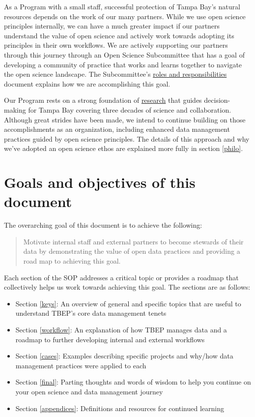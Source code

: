 \documentclass[
]{book}
\providecommand{\tightlist}{%
  \setlength{\itemsep}{0pt}\setlength{\parskip}{0pt}}
\begin{document}
As a Program with a small staff, successful protection of Tampa Bay's natural resources depends on the work of our many partners. While we use open science principles internally, we can have a much greater impact if our partners understand the value of open science and actively work towards adopting its principles in their own workflows. We are actively supporting our partners through this journey through an Open Science Subcommittee that has a goal of developing a community of practice that works and learns together to navigate the open science landscape. The Subcommittee's \href{https://docs.google.com/document/d/1w6dVTwfYYDRVzGPXy0jyHxV4mwOutEY_ISMP1oAdZ_c/edit}{roles and responsibilities} document explains how we are accomplishing this goal.

Our Program rests on a strong foundation of \href{https://tbep.org/our-work/library/}{research} that guides decision-making for Tampa Bay covering three decades of science and collaboration. Although great strides have been made, we intend to continue building on those accomplishments as an organization, including enhanced data management practices guided by open science principles. The details of this approach and why we've adopted an open science ethos are explained more fully in section \ref{philo}.

\section{Goals and objectives of this document}\label{goals-and-objectives-of-this-document}

The overarching goal of this document is to achieve the following:

\begin{quote}
Motivate internal staff and external partners to become stewards of their data by demonstrating the value of open data practices and providing a road map to achieving this goal.
\end{quote}

Each section of the SOP addresses a critical topic or provides a roadmap that collectively helps us work towards achieving this goal. The sections are as follows:

\begin{itemize}
\tightlist
\item
  Section \ref{keys}: An overview of general and specific topics that are useful to understand TBEP's core data management tenets
\item
  Section \ref{workflow}: An explanation of how TBEP manages data and a roadmap to further developing internal and external workflows
\item
  Section \ref{cases}: Examples describing specific projects and why/how data management practices were applied to each
\item
  Section \ref{final}: Parting thoughts and words of wisdom to help you continue on your open science and data management journey
\item
  Section \ref{appendices}: Definitions and resources for continued learning
\end{itemize}
\end{document}
